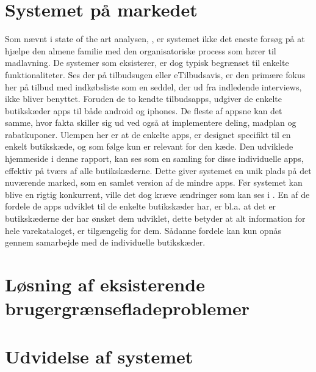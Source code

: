 \section{Systemet på markedet}
Som nævnt i state of the art analysen, , er systemet ikke det eneste forsøg på at hjælpe den almene familie med den organisatoriske process som hører til madlavning.
De systemer som eksisterer, er dog typisk begrænset til enkelte funktionaliteter.
Ses der på tilbudsugen eller eTilbudsavis, er den primære fokus her på tilbud med indkøbsliste som en seddel, der ud fra indledende interviews, ikke bliver benyttet.
Foruden de to kendte tilbudsapps, udgiver de enkelte butikskæder apps til både android og iphones.
De fleste af appsne kan det samme, hvor fakta skiller sig ud ved også at implementere deling, madplan og rabatkuponer.
Ulempen her er at de enkelte apps, er designet specifikt til en enkelt butikskæde, og som følge kun er relevant for den kæde.
Den udviklede hjemmeside i denne rapport, kan ses som en samling for disse individuelle apps, effektiv på tværs af alle butikskæderne.
Dette giver systemet en unik plads på det nuværende marked, som en samlet version af de mindre apps.
Før systemet kan blive en rigtig konkurrent, ville det dog kræve ændringer som kan ses i .
En af de fordele de apps udviklet til de enkelte butikskæder har, er bl.a. at det er butikskæderne der har ønsket dem udviklet, dette betyder at alt information for hele varekataloget, er tilgængelig for dem.
Sådanne fordele kan kun opnås gennem samarbejde med de individuelle butikskæder.

\section{Løsning af eksisterende brugergrænsefladeproblemer}

\section{Udvidelse af systemet}\label{udvidelse}
